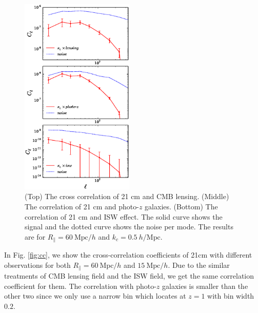 \documentclass[aps,prl,twocolumn,showpacs,superscriptaddress,groupedaddress,nofootinbib,floatfix]{revtex4}  %
\newcommand{\mr}{\mathrm}
\begin{document}
\begin{figure}[tbp]
\begin{center}
\includegraphics[width=0.48\textwidth]{f8.eps}
\end{center}
\vspace{-1.9cm}
\caption{(Top) The cross correlation of 21 cm and CMB lensing.
(Middle) The correlation of 21 cm and photo-$z$ galaxies. (Bottom) The
correlation of 21 cm and ISW effect. The solid curve shows the signal and the 
dotted curve shows the noise per mode. The results are 
for $R_\parallel=60\ \mr{Mpc}/h$ and $k_c=0.5\ h/\mr{Mpc}$.}
\label{fig:cs}
\end{figure}

In Fig. \ref{fig:cc}, we show the cross-correlation coefficients of 21cm with 
different observations for both $R_\parallel=60\ \mr{Mpc}/h$ and 
$15\ \mr{Mpc}/h$. Due to the similar treatments of CMB lensing field
and the ISW field, we get the same correlation coefficient for them. 
The correlation with photo-$z$ galaxies is smaller than the other
two since we only use a narrow bin which locates at $z=1$ with bin width $0.2$.
\end{document}
